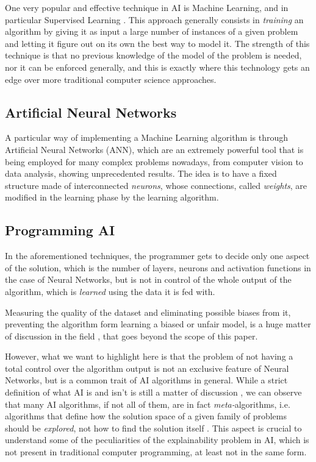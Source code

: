 \documentclass[conference]{IEEEtran}
\newcommand{\cit}{\todo[tickmarkheight=0.2cm]{cit}}
\begin{document}
One very popular and effective technique in AI is Machine Learning, and in
particular Supervised Learning \cit. This approach generally consists in
\textit{training} an algorithm by giving it as input a large number of instances
of a given problem and letting it figure out on its own the best way to model it. The
strength of this technique is that no previous knowledge of the model of the
problem is needed, nor it can be enforced generally, and this is exactly
where this technology gets an edge over more traditional computer science
approaches.

\subsection{Artificial Neural Networks}
\label{sec:nn}

A particular way of implementing a Machine Learning algorithm is through Artificial Neural Networks (ANN), which are an extremely powerful tool that is being employed for many complex problems nowadays, from computer vision to data analysis, showing unprecedented results. The idea is to have a fixed structure made of interconnected \textit{neurons}, whose connections, called \textit{weights}, are modified in the learning phase by the learning algorithm.

\subsection{Programming AI}
\label{sec:nn}

In the aforementioned techniques, the programmer gets to decide only one aspect of the solution, which is the number of layers, neurons and activation functions in the case of Neural Networks, but is not in control of the whole output of the algorithm, which is \textit{learned} using the data it is fed with.

Measuring the quality of the dataset and eliminating possible biases from it, preventing the algorithm form learning a biased or unfair model, is a huge matter of discussion in the field \cit, that goes beyond the scope of this paper.

However, what we want to highlight here is that the problem of not having a total control over the algorithm output is not an exclusive feature of Neural Networks, but is a common trait of AI algorithms in general. While a strict definition of what AI is and isn't is still a matter of discussion \cit, we can observe that many AI algorithms, if not all of them, are in fact \textit{meta-}algorithms, i.e. algorithms that define how the solution space of a given family of problems should be \textit{explored}, not how to find the solution itself \cit. This aspect is crucial to understand some of the peculiarities of the explainability problem in AI, which is not present in traditional computer programming, at least not in the same form.
\end{document}
